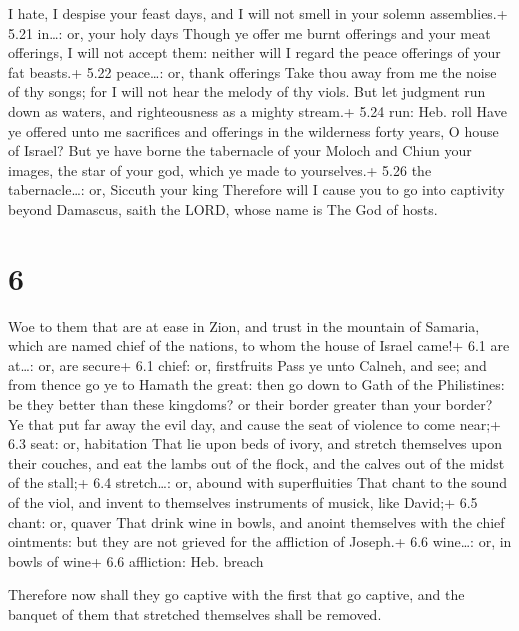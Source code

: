 I hate, I despise your feast days, and I will not smell
in your solemn assemblies.+ 5.21 in\ldots: or, your holy days
 Though ye offer me burnt offerings and your meat
offerings, I will not accept them: neither will I regard the peace
offerings of your fat beasts.+ 5.22 peace\ldots: or, thank offerings
 Take thou away from me the noise of thy songs; for I will
not hear the melody of thy viols.  But let judgment run
down as waters, and righteousness as a mighty stream.+ 5.24 run: Heb.
roll  Have ye offered unto me sacrifices and offerings in
the wilderness forty years, O house of Israel?  But ye have
borne the tabernacle of your Moloch and Chiun your images, the star of
your god, which ye made to yourselves.+ 5.26 the tabernacle\ldots: or,
Siccuth your king  Therefore will I cause you to go into
captivity beyond Damascus, saith the LORD, whose name is The God of
hosts.

\hypertarget{section-5}{%
\section{6}\label{section-5}}

 Woe to them that are at ease in Zion, and trust in the
mountain of Samaria, which are named chief of the nations, to whom the
house of Israel came!+ 6.1 are at\ldots: or, are secure+ 6.1 chief: or,
firstfruits  Pass ye unto Calneh, and see; and from thence
go ye to Hamath the great: then go down to Gath of the Philistines: be
they better than these kingdoms? or their border greater than your
border?  Ye that put far away the evil day, and cause the
seat of violence to come near;+ 6.3 seat: or, habitation 
That lie upon beds of ivory, and stretch themselves upon their couches,
and eat the lambs out of the flock, and the calves out of the midst of
the stall;+ 6.4 stretch\ldots: or, abound with superfluities
 That chant to the sound of the viol, and invent to
themselves instruments of musick, like David;+ 6.5 chant: or, quaver
 That drink wine in bowls, and anoint themselves with the
chief ointments: but they are not grieved for the affliction of Joseph.+
6.6 wine\ldots: or, in bowls of wine+ 6.6 affliction: Heb. breach

 Therefore now shall they go captive with the first that
go captive, and the banquet of them that stretched themselves shall be
removed.

